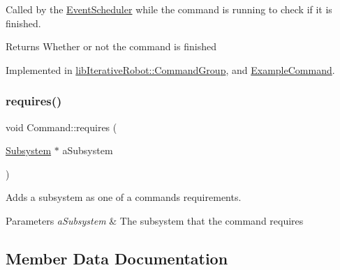 Called by the \mbox{\hyperlink{classlib_iterative_robot_1_1_event_scheduler}{Event\+Scheduler}} while the command is running to check if it is finished. 

\begin{DoxyReturn}{Returns}
Whether or not the command is finished 
\end{DoxyReturn}


Implemented in \mbox{\hyperlink{classlib_iterative_robot_1_1_command_group_a96807a2763adf9e21ebf2cb9e3574e3c}{lib\+Iterative\+Robot\+::\+Command\+Group}}, and \mbox{\hyperlink{class_example_command_ab4e52d526bda7fe22705b2d3c44286e0}{Example\+Command}}.

\mbox{\label{classlib_iterative_robot_1_1_command_ad7b7f328974f5f17a2a4b1593b6c9eb5}} 
\subsubsection{\texorpdfstring{requires()}{requires()}}
{\footnotesize\ttfamily void Command\+::requires (\begin{DoxyParamCaption}\item[{\mbox{\hyperlink{classlib_iterative_robot_1_1_subsystem}{Subsystem}} $\ast$}]{a\+Subsystem }\end{DoxyParamCaption})\hspace{0.3cm}{\ttfamily [protected]}}



Adds a subsystem as one of a command\textquotesingle{}s requirements. 


\begin{DoxyParams}{Parameters}
{\em a\+Subsystem} & The subsystem that the command requires \\
\hline
\end{DoxyParams}


\subsection{Member Data Documentation}
\mbox{\label{classlib_iterative_robot_1_1_command_abbedf025246921d5cde67aa954b74d35}} 
